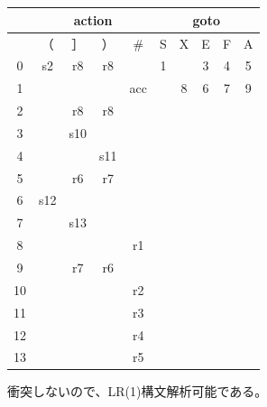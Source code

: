 \documentclass[a4paper,10pt]{jsarticle}
\begin{document}
\section{}
\begin{table}[H]
  \centering
  \begin{tabular}{|c||c|c|c|c|c|c|c|c|c|}
    \hline
       & \multicolumn{4}{c|}{action} & \multicolumn{5}{c|}{goto}                                 \\ \hline
       & （                          & ］                        & ）  & \#  & S & X & E & F & A \\ \hline\hline
    0  & s2                          & r8                        & r8  &     & 1 &   & 3 & 4 & 5 \\ \hline
    1  &                             &                           &     & acc &   & 8 & 6 & 7 & 9 \\ \hline
    2  &                             & r8                        & r8  &     &   &   &   &   &   \\ \hline
    3  &                             & s10                       &     &     &   &   &   &   &   \\ \hline
    4  &                             &                           & s11 &     &   &   &   &   &   \\ \hline
    5  &                             & r6                        & r7  &     &   &   &   &   &   \\ \hline
    6  & s12                         &                           &     &     &   &   &   &   &   \\ \hline
    7  &                             & s13                       &     &     &   &   &   &   &   \\ \hline
    8  &                             &                           &     & r1  &   &   &   &   &   \\ \hline
    9  &                             & r7                        & r6  &     &   &   &   &   &   \\ \hline
    10 &                             &                           &     & r2  &   &   &   &   &   \\ \hline
    11 &                             &                           &     & r3  &   &   &   &   &   \\ \hline
    12 &                             &                           &     & r4  &   &   &   &   &   \\ \hline
    13 &                             &                           &     & r5  &   &   &   &   &   \\ \hline
  \end{tabular}
\end{table}

衝突しないので、LR(1)構文解析可能である。
\end{document}
